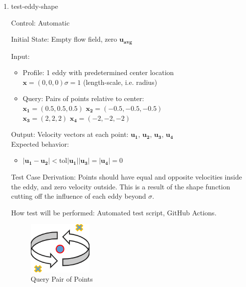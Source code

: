 \documentclass[12pt, titlepage]{article}
\begin{document}
\begin{enumerate}

  \item{test-eddy-shape\\}

  Control: Automatic
            
  Initial State: Empty flow field, zero $\mathbf{u_{avg}}$
            
  Input:
  \begin{itemize}
    \item Profile: 1 eddy with predetermined center location\\
    $\mathbf{x}=(0,0,0)$\tab$\sigma=1$ (length-scale, i.e. radius) 
    \item Query: Pairs of points relative to center:\\
    $\mathbf{x_1}=(0.5,0.5,0.5)$ \tab$\mathbf{x_2}=(-0.5,-0.5,-0.5)$\\
    $\mathbf{x_3}=(2,2,2)$ \tab$\mathbf{x_4}=(-2,-2,-2)$
  \end{itemize}
  Output: Velocity vectors at each point: $\mathbf{u_1}$, $\mathbf{u_2}$, $\mathbf{u_3}$, $\mathbf{u_4}$\\
  Expected behavior:
  \begin{itemize}
    \item $|\mathbf{u_1} -\mathbf{u_2}| <\text{tol}|\mathbf{u_1}|$\tab $|\mathbf{u_3}| = |\mathbf{u_4}|=0$
  \end{itemize}

  Test Case Derivation: Points should have equal and opposite velocities inside the eddy, and zero velocity outside. This is a result of the shape function cutting off the influence of each eddy beyond $\sigma$.
            
  How test will be performed: Automated test script, GitHub Actions.

  \begin{figure}[h!]
    \begin{center}
    \includegraphics[width=0.3\textwidth]{eddy-shape.png}
    \caption{Query Pair of Points}
    \label{Fig_EddyShape} 
    \end{center}
  \end{figure}


\end{enumerate}
\end{document}
